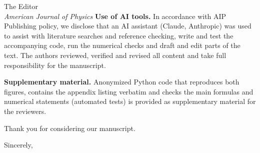 \documentclass[11pt]{letter}
\begin{document}
\begin{letter}{The Editor\\ \emph{American Journal of Physics}}
\textbf{Use of AI tools.} In accordance with AIP Publishing policy, we disclose that an AI assistant (Claude, Anthropic) was used to assist with literature searches and reference checking, write and test the accompanying code, run the numerical checks and draft and edit parts of the text. The authors reviewed, verified and revised all content and take full responsibility for the manuscript.

\textbf{Supplementary material.} Anonymized Python code that reproduces both figures, contains the appendix listing verbatim and checks the main formulas and numerical statements (automated tests) is provided as supplementary material for the reviewers.

Thank you for considering our manuscript.

\closing{Sincerely,}
\end{letter}
\end{document}
